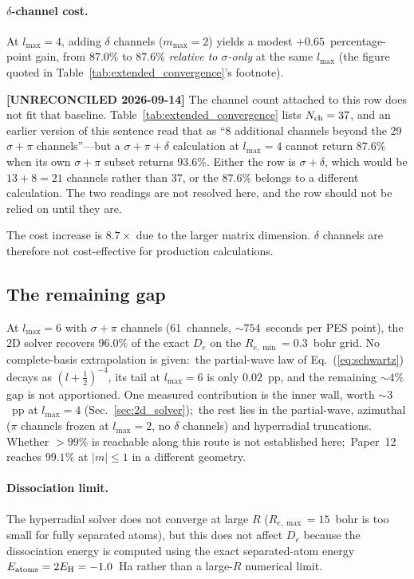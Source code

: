 \documentclass[aps,pra,twocolumn,superscriptaddress,longbibliography]{revtex4-2}
\begin{document}
\paragraph{$\delta$-channel cost.}
At $l_{\max} = 4$, adding $\delta$ channels ($m_{\max} = 2$) yields a
modest $+0.65$~percentage-point gain, from $87.0\%$ to $87.6\%$
\emph{relative to $\sigma$-only} at the same $l_{\max}$ (the figure
quoted in Table~\ref{tab:extended_convergence}'s footnote).

\textbf{[UNRECONCILED 2026-09-14]} The channel count attached to this
row does not fit that baseline.  Table~\ref{tab:extended_convergence}
lists $N_{\rm ch} = 37$, and an earlier version of this sentence read
that as ``8 additional channels beyond the 29 $\sigma{+}\pi$
channels''---but a $\sigma{+}\pi{+}\delta$ calculation at
$l_{\max} = 4$ cannot return $87.6\%$ when its own $\sigma{+}\pi$
subset returns $93.6\%$.  Either the row is $\sigma{+}\delta$, which
would be $13 + 8 = 21$ channels rather than 37, or the $87.6\%$ belongs
to a different calculation.  The two readings are not resolved here,
and the row should not be relied on until they are.

The cost increase is $8.7\times$ due to the larger matrix dimension.
$\delta$ channels are therefore not cost-effective for production
calculations.

\subsection{The remaining gap}

At $l_{\max} = 6$ with $\sigma{+}\pi$ channels (61~channels,
${\sim}754$~seconds per PES point), the 2D solver recovers
96.0\% of the exact $D_e$ on the $R_{e,\min} = 0.3$~bohr grid.
No complete-basis extrapolation is given:\ the partial-wave law of
Eq.~(\ref{eq:schwartz}) decays as $(l+\tfrac12)^{-4}$, its tail at
$l_{\max}=6$ is only $0.02$~pp, and the remaining ${\sim}4\%$ gap is
not apportioned.  One measured contribution is the inner wall, worth
${\sim}3$~pp at $l_{\max}=4$ (Sec.~\ref{sec:2d_solver});\ the rest
lies in the partial-wave, azimuthal ($\pi$ channels frozen at
$l_{\max}=2$, no $\delta$ channels) and hyperradial truncations.
Whether $> 99\%$ is reachable along this route is not established
here;\ Paper~12 reaches $99.1\%$ at $|m| \le 1$ in a different geometry.

\paragraph{Dissociation limit.}
The hyperradial solver does not converge at large $R$
($R_{e,\max} = 15$~bohr is too small for fully separated atoms),
but this does not affect $D_e$ because the dissociation energy is
computed using the exact separated-atom energy
$E_{\rm atoms} = 2E_{\rm H} = -1.0$~Ha rather than a large-$R$
numerical limit.
\end{document}
